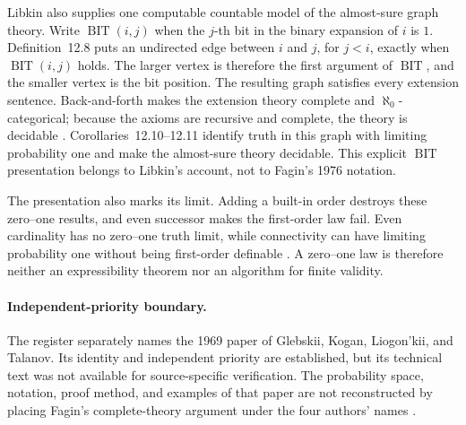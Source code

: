 Libkin also supplies one computable countable model of the almost-sure graph
theory.  Write \(\operatorname{BIT}(i,j)\) when the \(j\)-th bit in the binary
expansion of \(i\) is \(1\).  Definition~12.8 puts an undirected edge between
\(i\) and \(j\), for \(j<i\), exactly when
\(\operatorname{BIT}(i,j)\) holds.  The larger vertex is therefore the first
argument of \(\operatorname{BIT}\), and the smaller vertex is the bit position.
The resulting graph satisfies every extension sentence.  Back-and-forth makes
the extension theory complete and \(\aleph_0\)-categorical; because the axioms
are recursive and complete, the theory is decidable
\cite[def.~12.8 and thm.~12.9]{Libkin2004}.  Corollaries~12.10--12.11 identify
truth in this graph with limiting probability one and make the almost-sure
theory decidable.  This explicit \(\operatorname{BIT}\) presentation belongs
to Libkin's account, not to Fagin's 1976 notation.

The presentation also marks its limit.  Adding a built-in order destroys these
zero--one results, and even successor makes the first-order law fail.  Even
cardinality has no zero--one truth limit, while connectivity can have limiting
probability one without being first-order definable
\cite[pp.~235--242]{Libkin2004}.  A zero--one law is therefore neither an
expressibility theorem nor an algorithm for finite validity.

\paragraph{Independent-priority boundary.}
The register separately names the 1969 paper of Glebskii, Kogan, Liogon'kii,
and Talanov.  Its identity and independent priority are established, but its
technical text was not available for source-specific verification.  The
probability space, notation, proof method, and examples of that paper are not
reconstructed by placing Fagin's complete-theory argument under the four
authors' names \cite{GlebskiiEtAl1969}.
